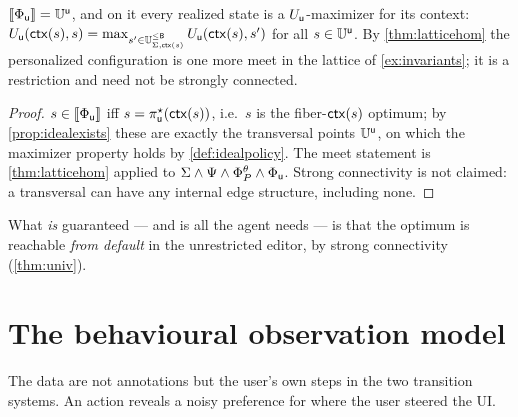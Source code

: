 \documentclass[../uxoxo-main]{subfiles}
\begin{document}
\begin{proposition}\label{prop:phiu}
$\llbracket\Phi_{\mathsf{u}}\rrbracket=\mathbb{U}^{\mathsf{u}}$, and on it every realized state is a
$U_{\mathsf{u}}$-maximizer for its context:
$U_{\mathsf{u}}(\mathsf{ctx}(s),s)=\max_{s'\in\mathbb{U}_{\Sigma,\mathsf{ctx}(s)}^{\le \mathsf{B}}}U_{\mathsf{u}}(\mathsf{ctx}(s),s')$ for all
$s\in\mathbb{U}^{\mathsf{u}}$. By \cref{thm:latticehom} the personalized configuration is one
more meet in the lattice of \cref{ex:invariants}; it is a restriction and need
not be strongly connected.
\end{proposition}

\begin{proof}
$s\in\llbracket\Phi_{\mathsf{u}}\rrbracket$ iff $s=\pi^\star_{\mathsf{u}}(\mathsf{ctx}(s))$, i.e.\ $s$ is the
fiber-$\mathsf{ctx}(s)$ optimum; by \cref{prop:idealexists} these are exactly the
transversal points $\mathbb{U}^{\mathsf{u}}$, on which the maximizer property holds by
\cref{def:idealpolicy}. The meet statement is \cref{thm:latticehom} applied to
$\Sigma\wedge\Psi\wedge\Phi^\theta_P\wedge\Phi_{\mathsf{u}}$. Strong connectivity is not
claimed: a transversal can have any internal edge structure, including none.
\end{proof}

What \emph{is} guaranteed --- and is all the agent needs --- is that the optimum
is reachable \emph{from default} in the unrestricted editor, by strong
connectivity (\cref{thm:univ}).

\begin{center}
\end{center}


\section{The behavioural observation model}\label{sec:obs}
The data are not annotations but the user's own steps in the two transition
systems. An action reveals a noisy preference for where the user steered the UI.
\end{document}
